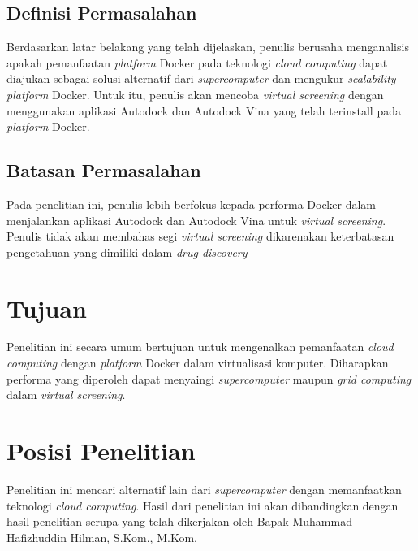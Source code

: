 \subsection{Definisi Permasalahan}
\hspace{0.5cm}Berdasarkan latar belakang yang telah dijelaskan, penulis berusaha menganalisis apakah pemanfaatan \textit{platform} Docker pada teknologi \textit{cloud computing} dapat diajukan sebagai solusi alternatif dari \textit{supercomputer} dan mengukur \textit{scalability platform} Docker. Untuk itu, penulis akan mencoba \textit{virtual screening} dengan menggunakan aplikasi Autodock dan Autodock Vina yang telah terinstall pada \textit{platform} Docker.

\subsection{Batasan Permasalahan}
\hspace{0.5cm}Pada penelitian ini, penulis lebih berfokus kepada performa Docker dalam menjalankan aplikasi Autodock dan Autodock Vina untuk \textit{virtual screening}. Penulis tidak akan membahas segi \textit{virtual screening} dikarenakan keterbatasan pengetahuan yang dimiliki dalam \textit{drug discovery}

\section{Tujuan}
\hspace{0.5cm}Penelitian ini secara umum bertujuan untuk mengenalkan pemanfaatan \textit{cloud computing} dengan \textit{platform} Docker dalam virtualisasi komputer. Diharapkan performa yang diperoleh dapat menyaingi \textit{supercomputer} maupun \textit{grid computing} dalam \textit{virtual screening}.


\section{Posisi Penelitian}
\hspace{0.5cm}Penelitian ini mencari alternatif lain dari \textit{supercomputer} dengan memanfaatkan teknologi \textit{cloud computing}. Hasil dari penelitian ini akan dibandingkan dengan hasil penelitian serupa yang telah dikerjakan oleh Bapak Muhammad Hafizhuddin Hilman, S.Kom., M.Kom. \cite{cluster_pak hilman} \cite{cloud_pak hilman} 

